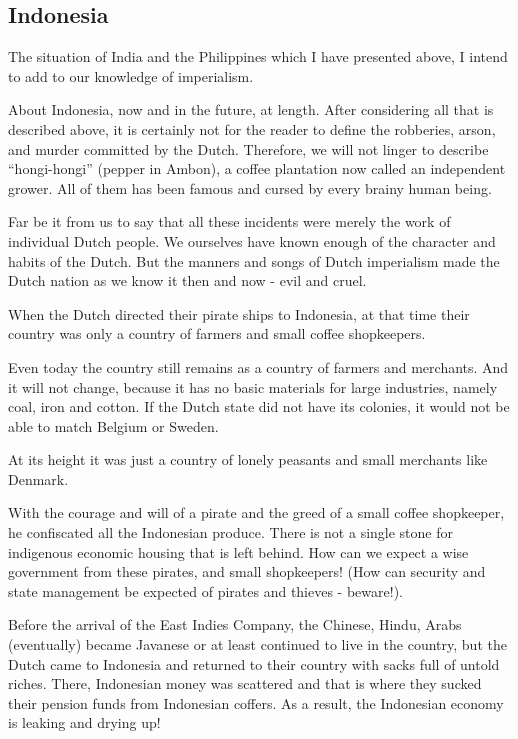 \subsection{Indonesia}

The situation of India and the Philippines which I have presented above, 
I intend to add to our knowledge of imperialism.\vskip 0.2in

About Indonesia, now and in the future, at length. After considering all 
that is described above, it is certainly not for the reader to define the 
robberies, arson, and murder committed by the Dutch. Therefore, we will not 
linger to describe “hongi-hongi” (pepper in Ambon), a coffee plantation now 
called an independent grower. All of them has been famous and cursed by every brainy human being.\vskip 0.2in

Far be it from us to say that all these incidents were merely the work of 
individual Dutch people. We ourselves have known enough of the character and 
habits of the Dutch. But the manners and songs of Dutch imperialism made the 
Dutch nation as we know it then and now - evil and cruel.\vskip 0.2in

When the Dutch directed their pirate ships to Indonesia, at that time their 
country was only a country of farmers and small coffee shopkeepers.\vskip 0.2in

Even today the country still remains as a country of farmers and merchants. 
And it will not change, because it has no basic materials for large industries, 
namely coal, iron and cotton. If the Dutch state did not have its colonies, 
it would not be able to match Belgium or Sweden.\vskip 0.2in

At its height it was just a country of lonely peasants and small merchants like Denmark.\vskip 0.2in

With the courage and will of a pirate and the greed of a small coffee shopkeeper, 
he confiscated all the Indonesian produce. There is not a single stone for indigenous 
economic housing that is left behind. How can we expect a wise government from these 
pirates, and small shopkeepers! (How can security and state management be expected of pirates and thieves - beware!).\vskip 0.2in

Before the arrival of the East Indies Company, the Chinese, Hindu, Arabs (eventually) 
became Javanese or at least continued to live in the country, but the Dutch came to 
Indonesia and returned to their country with sacks full of untold riches. There, 
Indonesian money was scattered and that is where they sucked their pension funds 
from Indonesian coffers. As a result, the Indonesian economy is leaking and drying up!\vskip 0.2in

